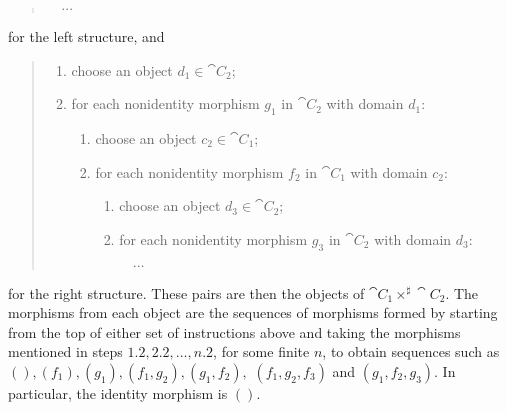 \documentclass[Book-Poly]{subfiles}
\begin{document}
\begin{example}
\begin{quote}
\begin{enumerate}[label=1.\arabic*.]
\begin{enumerate}[label=2.\arabic*.]
\begin{enumerate}[label=3.\arabic*.]
            $\quad \cdots$
        \end{enumerate}
    \end{enumerate}
\end{enumerate}
\end{quote}
for the left structure, and
\begin{quote}
\begin{enumerate}[label=1.\arabic*.]
    \item choose an object $d_1 \in \cat{C}_2$;
    \item for each nonidentity morphism $g_1$ in $\cat{C}_2$ with domain $d_1$:
    \begin{enumerate}[label=2.\arabic*.]
        \item choose an object $c_2 \in \cat{C}_1$;
        \item for each nonidentity morphism $f_2$ in $\cat{C}_1$ with domain $c_2$:
        \begin{enumerate}[label=3.\arabic*.]
            \item choose an object $d_3 \in \cat{C}_2$;
            \item for each nonidentity morphism $g_3$ in $\cat{C}_2$ with domain $d_3$:
            
            $\quad \cdots$
        \end{enumerate}
    \end{enumerate}
\end{enumerate}
\end{quote}
for the right structure.
These pairs are then the objects of $\cat{C}_1 \times^\sharp \cat{C}_2$.
The morphisms from each object are the sequences of morphisms formed by starting from the top of either set of instructions above and taking the morphisms mentioned in steps $1.2, 2.2, \ldots, n.2$, for some finite $n$, to obtain sequences such as $(), (f_1), (g_1), (f_1, g_2), (g_1, f_2),$ $(f_1, g_2, f_3)$ and $(g_1, f_2, g_3)$.
In particular, the identity morphism is $()$.


\end{example}
\end{document}
